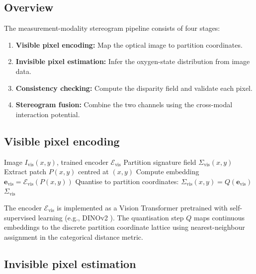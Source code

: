 \documentclass[11pt,twocolumn,a4paper]{article}
\newcommand{\Sigvis}{\Sigma_{\mathrm{vis}}}
\begin{document}
\subsection{Overview}

The measurement-modality stereogram pipeline consists of four stages:
\begin{enumerate}
\item \textbf{Visible pixel encoding:} Map the optical image to partition coordinates.
\item \textbf{Invisible pixel estimation:} Infer the oxygen-state distribution from image data.
\item \textbf{Consistency checking:} Compute the disparity field and validate each pixel.
\item \textbf{Stereogram fusion:} Combine the two channels using the cross-modal interaction potential.
\end{enumerate}

\subsection{Visible pixel encoding}

\begin{algorithm}[H]
\caption{Visible Pixel Encoding}\label{alg:visible}
\begin{algorithmic}[1]
\REQUIRE Image $I_{\mathrm{vis}}(x,y)$, trained encoder $\mathcal{E}_{\mathrm{vis}}$
\ENSURE Partition signature field $\Sigvis(x,y)$
    \STATE Extract patch $P(x,y)$ centred at $(x,y)$
    \STATE Compute embedding $\mathbf{e}_{\mathrm{vis}} = \mathcal{E}_{\mathrm{vis}}(P(x,y))$
    \STATE Quantise to partition coordinates: $\Sigvis(x,y) = Q(\mathbf{e}_{\mathrm{vis}})$
\ENDFOR
\RETURN $\Sigvis$
\end{algorithmic}
\end{algorithm}

The encoder $\mathcal{E}_{\mathrm{vis}}$ is implemented as a Vision Transformer \citep{Dosovitskiy2021} pretrained with self-supervised learning (e.g., DINOv2 \citep{Oquab2024}).
The quantisation step $Q$ maps continuous embeddings to the discrete partition coordinate lattice using nearest-neighbour assignment in the categorical distance metric.

\subsection{Invisible pixel estimation}
\end{document}
